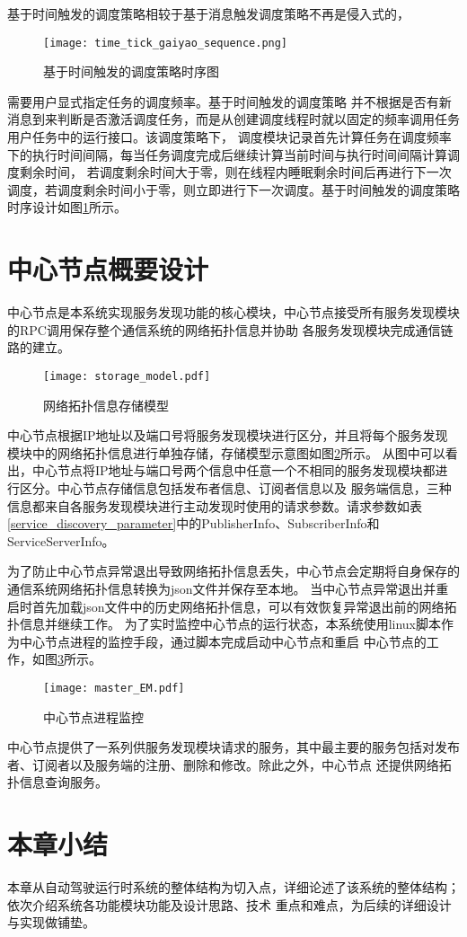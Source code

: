 基于时间触发的调度策略相较于基于消息触发调度策略不再是侵入式的，
\begin{figure}[htb]
  \centering
  \texttt{[image: time\_tick\_gaiyao\_sequence.png]}
  \caption{基于时间触发的调度策略时序图}
  \label{time_tick_gaiyao_sequence}
\end{figure}
需要用户显式指定任务的调度频率。基于时间触发的调度策略
并不根据是否有新消息到来判断是否激活调度任务，而是从创建调度线程时就以固定的频率调用任务用户任务中的运行接口。该调度策略下，
调度模块记录首先计算任务在调度频率下的执行时间间隔，每当任务调度完成后继续计算当前时间与执行时间间隔计算调度剩余时间，
若调度剩余时间大于零，则在线程内睡眠剩余时间后再进行下一次调度，若调度剩余时间小于零，则立即进行下一次调度。基于时间触发的调度策略
时序设计如图\ref{time_tick_gaiyao_sequence}所示。


\section{中心节点概要设计}
中心节点是本系统实现服务发现功能的核心模块，中心节点接受所有服务发现模块的RPC调用保存整个通信系统的网络拓扑信息并协助
各服务发现模块完成通信链路的建立。

\begin{figure}[htb]
  \centering
  \texttt{[image: storage\_model.pdf]}
  \caption{网络拓扑信息存储模型}
  \label{storage_model}
\end{figure}

中心节点根据IP地址以及端口号将服务发现模块进行区分，并且将每个服务发现模块中的网络拓扑信息进行单独存储，存储模型示意图如图\ref{storage_model}所示。
从图中可以看出，中心节点将IP地址与端口号两个信息中任意一个不相同的服务发现模块都进行区分。中心节点存储信息包括发布者信息、订阅者信息以及
服务端信息，三种信息都来自各服务发现模块进行主动发现时使用的请求参数。请求参数如表\ref{service_discovery_parameter}中的PublisherInfo、SubscriberInfo和
ServiceServerInfo。

为了防止中心节点异常退出导致网络拓扑信息丢失，中心节点会定期将自身保存的通信系统网络拓扑信息转换为json文件并保存至本地。
当中心节点异常退出并重启时首先加载json文件中的历史网络拓扑信息，可以有效恢复异常退出前的网络拓扑信息并继续工作。
为了实时监控中心节点的运行状态，本系统使用linux脚本作为中心节点进程的监控手段，通过脚本完成启动中心节点和重启
中心节点的工作，如图\ref{master_EM}所示。
\begin{figure}[htb]
  \centering
  \texttt{[image: master\_EM.pdf]}
  \caption{中心节点进程监控}
  \label{master_EM}
\end{figure}

中心节点提供了一系列供服务发现模块请求的服务，其中最主要的服务包括对发布者、订阅者以及服务端的注册、删除和修改。除此之外，中心节点
还提供网络拓扑信息查询服务。


\section{本章小结}
本章从自动驾驶运行时系统的整体结构为切入点，详细论述了该系统的整体结构；依次介绍系统各功能模块功能及设计思路、技术
重点和难点，为后续的详细设计与实现做铺垫。




